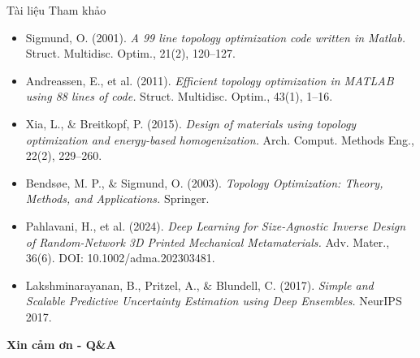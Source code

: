 \documentclass[aspectratio=169,11pt]{beamer}
\begin{document}
\begin{frame}{Tài liệu Tham khảo}
  \footnotesize
  \begin{itemize}
    \item Sigmund, O. (2001). \textit{A 99 line topology optimization code written in Matlab.} Struct. Multidisc. Optim., 21(2), 120--127.
    \item Andreassen, E., et al. (2011). \textit{Efficient topology optimization in MATLAB using 88 lines of code.} Struct. Multidisc. Optim., 43(1), 1--16.
    \item Xia, L., \& Breitkopf, P. (2015). \textit{Design of materials using topology optimization and energy-based homogenization.} Arch. Comput. Methods Eng., 22(2), 229--260.
    \item Bendsøe, M. P., \& Sigmund, O. (2003). \textit{Topology Optimization: Theory, Methods, and Applications.} Springer.
    \item Pahlavani, H., et al. (2024). \textit{Deep Learning for Size-Agnostic Inverse Design of Random-Network 3D Printed Mechanical Metamaterials.} Adv. Mater., 36(6). DOI: 10.1002/adma.202303481.
    \item Lakshminarayanan, B., Pritzel, A., \& Blundell, C. (2017). \textit{Simple and Scalable Predictive Uncertainty Estimation using Deep Ensembles.} NeurIPS 2017.
  \end{itemize}
  \vspace{4mm}
  \centering\Large\textbf{Xin cảm ơn - Q\&A}
\end{frame}
\end{document}
